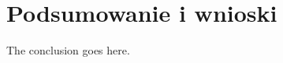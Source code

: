 \documentclass[journal,onecolumn]{IEEEtran}
\begin{document}
%











\section{Podsumowanie i wnioski}

The conclusion goes here.
\end{document}

